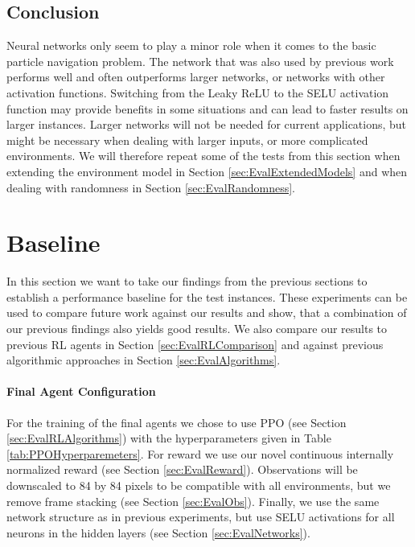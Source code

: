 \subsection{Conclusion} \label{sec:Eval/Networks/Conclusion}
Neural networks only seem to play a minor role when it comes to the basic particle navigation problem. The network that was also used by previous work performs well and often outperforms larger networks, or networks with other activation functions. Switching from the Leaky ReLU to the SELU activation function may provide benefits in some situations and can lead to faster results on larger instances. Larger networks will not be needed for current applications, but might be necessary when dealing with larger inputs, or more complicated environments. We will therefore repeat some of the tests from this section when extending the environment model in Section \ref{sec:EvalExtendedModels} and when dealing with randomness in Section \ref{sec:EvalRandomness}. 

\section{Baseline} \label{sec:EvalBaseline}
In this section we want to take our findings from the previous sections to establish a performance baseline for the test instances. These experiments can be used to compare future work against our results and show, that a combination of our previous findings also yields good results. We also compare our results to previous RL agents in Section \ref{sec:EvalRLComparison} and against previous algorithmic approaches in Section \ref{sec:EvalAlgorithms}.

\paragraph{Final Agent Configuration}
For the training of the final agents we chose to use PPO (see Section \ref{sec:EvalRLAlgorithms}) with the hyperparameters given in Table \ref{tab:PPOHyperparemeters}. For reward we use our novel continuous internally normalized reward (see Section \ref{sec:EvalReward}). Observations will be downscaled to 84 by 84 pixels to be compatible with all environments, but we remove frame stacking (see Section \ref{sec:EvalObs}). Finally, we use the same network structure as in previous experiments, but use SELU activations for all neurons in the hidden layers (see Section \ref{sec:EvalNetworks}).

